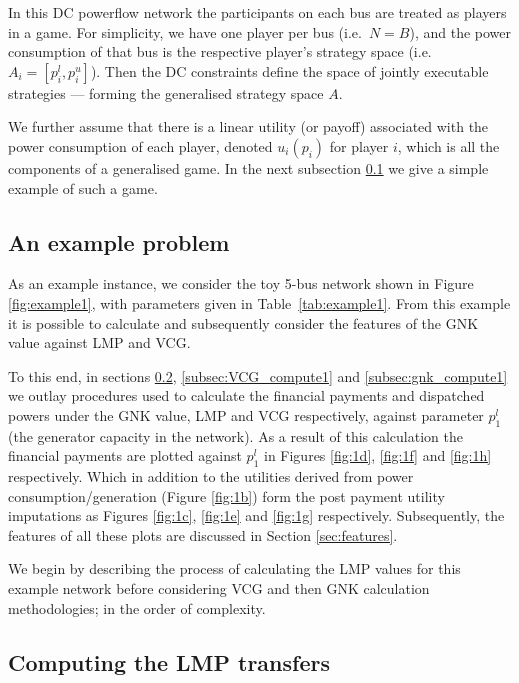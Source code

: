 In this DC powerflow network the participants on each bus are treated as players in a game.
For simplicity, we have one player per bus (i.e.~$N=B$), and the power consumption of that bus is the respective player's strategy space (i.e.\ $A_i=[p_i^l,p_i^u]$).
Then the DC constraints define the space of jointly executable strategies --- forming the generalised strategy space $A$.

We further assume that there is a linear utility (or payoff) associated with the power consumption of each player, denoted $u_i(p_i)$ for player $i$, which is all the components of a generalised game.
In the next subsection \ref{sec:example_network} we give a simple example of such a game.



\subsection{An example problem}\label{sec:example_network}

As an example instance, we consider the toy 5-bus network shown in Figure \ref{fig:example1}, with parameters given in Table~\ref{tab:example1}.
From this example it is possible to calculate and subsequently consider the features of the GNK value against LMP and VCG.

To this end, in sections \ref{subsec:LMP_compute1}, \ref{subsec:VCG_compute1} and \ref{subsec:gnk_compute1} we outlay procedures used to calculate the financial payments and dispatched powers under the GNK value, LMP and VCG respectively, against parameter $p_1^l$ (the generator capacity in the network).
As a result of this calculation the financial payments are plotted against $p_1^l$ in Figures \ref{fig:1d}, \ref{fig:1f} and \ref{fig:1h} respectively. Which in addition to the utilities derived from power consumption/generation (Figure \ref{fig:1b}) form the post payment utility imputations as Figures \ref{fig:1c}, \ref{fig:1e} and \ref{fig:1g} respectively.
Subsequently, the features of all these plots are discussed in Section \ref{sec:features}.

We begin by describing the process of calculating the LMP values for this example network before considering VCG and then GNK calculation methodologies; in the order of complexity.





\subsection{Computing the LMP transfers}\label{subsec:LMP_compute1}

